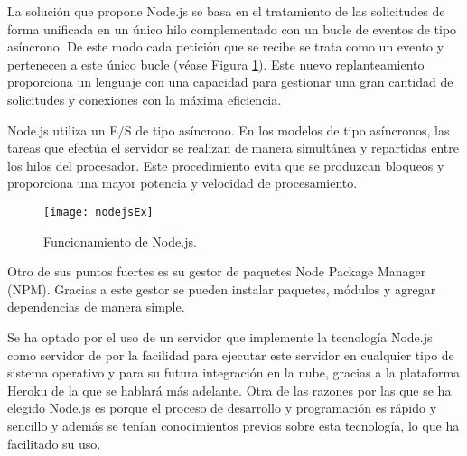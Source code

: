 La solución que propone Node.js se basa en el tratamiento de las solicitudes de forma unificada en un único hilo complementado con un bucle de eventos de tipo asíncrono. De este modo cada petición que se recibe se trata como un evento y pertenecen a este único bucle (véase Figura \ref{fig:nodejsEx}). Este nuevo replanteamiento proporciona un lenguaje con una capacidad para gestionar una gran cantidad de solicitudes y conexiones con la máxima eficiencia.

Node.js utiliza un E/S de tipo asíncrono. En los modelos de tipo asíncronos, las tareas que efectúa el servidor se realizan de manera simultánea y repartidas entre los hilos del procesador. Este procedimiento evita que se produzcan bloqueos y proporciona una mayor potencia y velocidad de procesamiento.

     
\begin{figure}[h]
    \centering
    \texttt{[image: nodejsEx]}
    \caption{Funcionamiento de Node.js.}
    \label{fig:nodejsEx}
\end{figure}




Otro de sus puntos fuertes es su gestor de paquetes Node Package Manager  (NPM). Gracias a este gestor se pueden instalar paquetes, módulos y agregar dependencias de manera simple.

Se ha optado por el uso de un servidor que implemente la tecnología Node.js como servidor de \ULLAR{} por la facilidad  para ejecutar este servidor en cualquier tipo de sistema operativo y para su futura integración en la nube, 
gracias a la plataforma Heroku de la que se hablará más adelante. 
Otra de las razones por las que se ha elegido Node.js es porque el proceso de desarrollo y programación es rápido y sencillo y además se tenían conocimientos previos sobre esta tecnología, lo que ha facilitado su uso.


